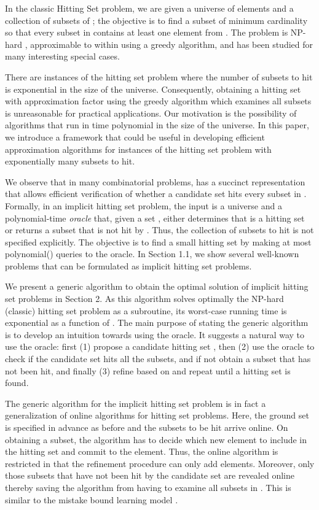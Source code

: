 \documentclass[11pt]{article}
\begin{document}
In the classic Hitting Set problem, we are given a universe  of elements and a collection  of subsets  of ; the objective is to find a subset  of minimum cardinality so that every subset  in  contains at least one element from . The problem is NP-hard \cite{karp-np-complete}, approximable to within  using a greedy algorithm, and has been studied for many interesting special cases.

There are instances of the hitting set problem where the number of subsets  to hit is exponential in the size of the universe. Consequently, obtaining a hitting set with approximation factor  using the greedy algorithm which examines all subsets is unreasonable for practical applications. Our motivation is the possibility of algorithms that run in time polynomial in the size of the universe. In this paper, we introduce a framework that could be useful in developing efficient approximation algorithms for instances of the hitting set problem with exponentially many subsets to hit.

We observe that in many combinatorial problems,  has a succinct
representation that allows efficient verification of whether a candidate set
hits every subset in . Formally, in an implicit hitting set problem, the
input is a universe  and a polynomial-time {\it oracle} that, given a set
, either determines that  is a hitting set or returns a subset that is
not hit by . Thus, the collection  of subsets to hit is not specified
explicitly. The objective is to find a small hitting set by making at most
polynomial() queries to the oracle. In Section 1.1, we show several
well-known problems that can be formulated as implicit hitting set problems.



We present a generic algorithm to obtain the optimal solution of implicit hitting set problems in Section 2. As this algorithm solves optimally the NP-hard (classic) hitting set problem as a subroutine, its worst-case running time is exponential as a function of . The main purpose of stating the generic algorithm is to develop an intuition towards using the oracle. It suggests a natural way to use the oracle: first (1) propose a candidate hitting set , then (2) use the oracle to check if the candidate set hits all the subsets, and if not obtain a subset  that has not been hit, and finally (3) refine  based on  and repeat until a hitting set is found. 

The generic algorithm for the implicit hitting set problem is in fact a generalization of online algorithms for hitting set problems. Here, the ground set is specified in advance as before and the subsets to be hit arrive online. On obtaining a subset, the algorithm has to decide which new element to include in the hitting set and commit to the element. Thus, the online algorithm is restricted in that the refinement procedure can only add elements.  Moreover, only those subsets that have not been hit by the candidate set are revealed online thereby saving the algorithm from having to examine all subsets in . This is similar to the mistake bound learning model \cite{littlestone88}.
\end{document}

